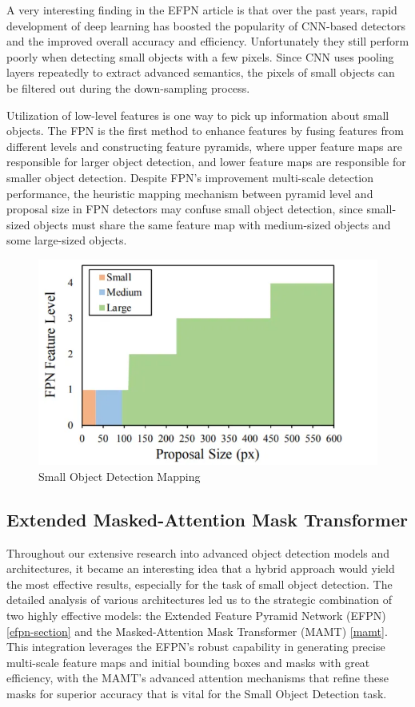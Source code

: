 A very interesting finding in the EFPN article is that over the past years, rapid development of deep learning has boosted the popularity of 
CNN-based detectors and the improved overall accuracy and efficiency. Unfortunately they still perform poorly when detecting small objects with a few pixels. 
Since CNN uses pooling layers repeatedly to extract advanced semantics, the pixels of small objects can be filtered out during the down-sampling process.

\newpage
Utilization of low-level features is one way to pick up information about small objects. The FPN is the first method to enhance features 
by fusing features from different levels and constructing feature pyramids, where upper feature maps are responsible for larger object detection, and lower 
feature maps are responsible for smaller object detection. Despite FPN's improvement multi-scale detection performance, the heuristic mapping mechanism 
between pyramid level and proposal size in FPN detectors may confuse small object detection, since small-sized objects must share the same feature map with 
medium-sized objects and some large-sized objects.

\begin{figure}[h!]
    \centering
    \includegraphics[scale=0.55]{Figures/efpn-sod-mapping.jpg}
    \caption{Small Object Detection Mapping \cite{efpn}}
    \label{fig:efpn-sod-mapping}
\end{figure}

\newpage
\subsection{Extended Masked-Attention Mask Transformer}

Throughout our extensive research into advanced object detection models and architectures, it became an interesting idea that a hybrid approach would 
yield the most effective results, especially for the task of small object detection. The detailed analysis of various architectures led us to the strategic 
combination of two highly effective models: the Extended Feature Pyramid Network (EFPN) \ref{efpn-section} and the Masked-Attention Mask Transformer (MAMT) \ref{mamt}. 
This integration leverages the EFPN’s robust capability in generating precise multi-scale feature maps and initial bounding boxes and masks with great efficiency, 
with the MAMT’s advanced attention mechanisms that refine these masks for superior accuracy that is vital for the Small Object Detection task. 

